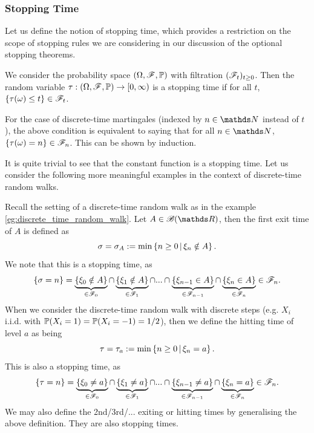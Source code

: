\subsubsection{Stopping Time}
Let us define the notion of stopping time, which provides a restriction on the scope of stopping rules we are considering in our discussion of the optional stopping theorems.

\begin{definition}
We consider the probability space $(\Omega,\mathcal{F},\mathbb{P})$ with filtration $(\mathcal{F}_t)_{t\geq 0}$. Then the random variable $\tau: (\Omega,\mathcal{F},\mathbb{P}) \to [0,\infty)$ is a stopping time if for all $t$, $\left\{ \tau(\omega) \leq t \right \} \in \mathcal{F}_t$.
\end{definition}

\begin{remark} \label{rmk:discrete_stopping_time}
For the case of discrete-time martingales (indexed by $n \in \N$ instead of $t$), the above condition is equivalent to saying that for all $n \in \N$, $\left\{ \tau(\omega) = n \right \} \in \mathcal{F}_n$. This can be shown by induction.
\end{remark}

It is quite trivial to see that the constant function is a stopping time. Let us consider the following more meaningful examples in the context of discrete-time random walks.

\begin{example} \label{eg:exit_time}
Recall the setting of a discrete-time random walk as in the example \ref{eg:discrete_time_random_walk}. Let $A \in \B(\R)$, then the first exit time of $A$ is defined as
\begin{equation}
    \sigma = \sigma_A := \min \left\{ n\geq 0 \,|\, \xi_n \notin A \right \}.
\end{equation}
We note that this is a stopping time, as 
\begin{equation}
    \left\{ \sigma = n \right \} = \underbrace{\left\{ \xi_0 \notin A \right \}}_{\in \mathcal{F}_0} \cap \underbrace{\left\{ \xi_1 \notin A \right \}}_{\in \mathcal{F}_1} \cap ... \cap \underbrace{\left\{ \xi_{n-1} \in A \right \}}_{\in \mathcal{F}_{n-1}} \cap \underbrace{\left\{ \xi_n \in A \right \}}_{\in \mathcal{F}_n} \in \mathcal{F}_n.
\end{equation}
When we consider the discrete-time random walk with discrete steps (e.g. $X_i$ i.i.d. with $\mathbb{P}(X_i = 1) = \mathbb{P}(X_i = -1) = 1/2$), then we define the hitting time of level $a$ as being
\begin{equation}
    \tau = \tau_a := \min \left\{ n\geq 0 \,|\, \xi_n = a \right \}.
\end{equation}
This is also a stopping time, as
\begin{equation}
    \left\{ \tau = n \right \} = \underbrace{\left\{ \xi_0 \neq a \right \}}_{\in \mathcal{F}_0} \cap \underbrace{\left\{ \xi_1 \neq a \right \}}_{\in \mathcal{F}_1} \cap ... \cap \underbrace{\left\{ \xi_{n-1} \neq a \right \}}_{\in \mathcal{F}_{n-1}} \cap \underbrace{\left\{ \xi_n = a \right \}}_{\in \mathcal{F}_n} \in \mathcal{F}_n.
\end{equation}
We may also define the 2nd/3rd/... exiting or hitting times by generalising the above definition. They are also stopping times.
\end{example}

